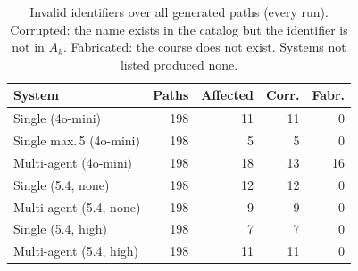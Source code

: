 \begin{table}[t]
\centering
\caption{Invalid identifiers over all generated paths (every run). Corrupted: the name exists in the catalog but the identifier is not in $A_k$. Fabricated: the course does not exist. Systems not listed produced none.}
\label{tab:halluc2}
\footnotesize
\begin{tabular}{lrrrr}
\toprule
System & Paths & Affected & Corr. & Fabr. \\
\midrule
Single (4o-mini) & 198 & 11 & 11 & 0 \\
Single max.\,5 (4o-mini) & 198 & 5 & 5 & 0 \\
Multi-agent (4o-mini) & 198 & 18 & 13 & 16 \\
Single (5.4, none) & 198 & 12 & 12 & 0 \\
Multi-agent (5.4, none) & 198 & 9 & 9 & 0 \\
Single (5.4, high) & 198 & 7 & 7 & 0 \\
Multi-agent (5.4, high) & 198 & 11 & 11 & 0 \\
\bottomrule
\end{tabular}
\end{table}
